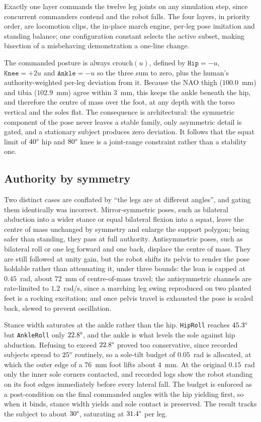 \documentclass[twocolumn]{article}
\begin{document}
Exactly one layer commands the twelve leg joints on any simulation step, since concurrent
commanders contend and the robot falls. The four layers, in priority order, are locomotion
clips, the in-place march engine, per-leg pose imitation and standing balance; one
configuration constant selects the active subset, making bisection of a misbehaving
demonstration a one-line change.

The commanded posture is always $\mathrm{crouch}(u)$, defined by $\texttt{Hip} = -u$,
$\texttt{Knee} = +2u$ and $\texttt{Ankle} = -u$ so the three sum to zero, plus the human's
authority-weighted per-leg deviation from it. Because the NAO thigh ($100.0$~mm) and tibia
($102.9$~mm) agree within $3$~mm, this keeps the ankle beneath the hip, and therefore the
centre of mass over the foot, at any depth with the torso vertical and the soles flat. The
consequence is architectural: the symmetric component of the pose never leaves a stable family,
only asymmetric detail is gated, and a stationary subject produces zero deviation. It follows
that the squat limit of $40\degree$ hip and $80\degree$ knee is a joint-range constraint rather
than a stability one.

\subsection{Authority by symmetry}

Two distinct cases are conflated by ``the legs are at different angles'', and gating them
identically was incorrect. Mirror-symmetric poses, such as bilateral abduction into a wider
stance or equal bilateral flexion into a squat, leave the centre of mass unchanged by symmetry
and enlarge the support polygon; being safer than standing, they pass at full authority.
Antisymmetric poses, such as bilateral roll or one leg forward and one back, displace the
centre of mass. They are still followed at unity gain, but the robot shifts its pelvis to
render the pose holdable rather than attenuating it, under three bounds: the lean is capped at
$0.45$~rad, about $72$~mm of centre-of-mass travel; the antisymmetric channels are rate-limited
to $1.2$~rad/s, since a marching leg swing reproduced on two planted feet is a rocking
excitation; and once pelvis travel is exhausted the pose is scaled back, slewed to prevent
oscillation.

Stance width saturates at the ankle rather than the hip. \texttt{HipRoll} reaches $45.3\degree$
but \texttt{AnkleRoll} only $22.8\degree$, and the ankle is what levels the sole against hip
abduction. Refusing to exceed $22.8\degree$ proved too conservative, since recorded subjects
spread to $25\degree$ routinely, so a sole-tilt budget of $0.05$~rad is allocated, at which the
outer edge of a $76$~mm foot lifts about $4$~mm. At the original $0.15$~rad only the inner sole
corners contacted, and recorded logs show the robot standing on its foot edges immediately
before every lateral fall. The budget is enforced as a post-condition on the final commanded
angles with the hip yielding first, so when it binds, stance width yields and sole contact is
preserved. The result tracks the subject to about $30\degree$, saturating at $31.4\degree$ per
leg.
\end{document}
